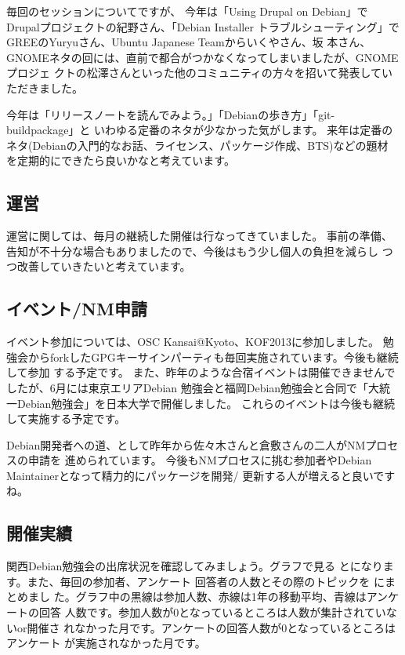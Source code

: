 \documentclass[mingoth,a4paper]{jsarticle}
\begin{document}
毎回のセッションについてですが、
今年は「Using Drupal on Debian」でDrupalプロジェクトの紀野さん、「Debian Installer
トラブルシューティング」でGREEのYuryuさん、Ubuntu Japanese Teamからいくやさん、坂
本さん、GNOMEネタの回には、直前で都合がつかなくなってしまいましたが、GNOMEプロジェ
クトの松澤さんといった他のコミュニティの方々を招いて発表していただきました。

今年は「リリースノートを読んでみよう。」「Debianの歩き方」「git-buildpackage」と
いわゆる定番のネタが少なかった気がします。
来年は定番のネタ(Debianの入門的なお話、ライセンス、パッケージ作成、BTS)などの題材
を定期的にできたら良いかなと考えています。

\subsection{運営}

運営に関しては、毎月の継続した開催は行なってきていました。
事前の準備、告知が不十分な場合もありましたので、今後はもう少し個人の負担を減らし
つつ改善していきたいと考えています。

\subsection{イベント/NM申請}

イベント参加については、OSC Kansai@Kyoto、KOF2013に参加しました。
勉強会からforkしたGPGキーサインパーティも毎回実施されています。今後も継続して参加
する予定です。
%
また、昨年のような合宿イベントは開催できませんでしたが、6月には東京エリアDebian
勉強会と福岡Debian勉強会と合同で「大統一Debian勉強会」を日本大学で開催しました。
これらのイベントは今後も継続して実施する予定です。

Debian開発者への道、として昨年から佐々木さんと倉敷さんの二人がNMプロセスの申請を
進められています。
今後もNMプロセスに挑む参加者やDebian Maintainerとなって精力的にパッケージを開発/
更新する人が増えると良いですね。

\subsection{開催実績}

関西Debian勉強会の出席状況を確認してみましょう。グラフで見る
とになります。また、毎回の参加者、アンケート
回答者の人数とその際のトピックを  にまとめまし
た。グラフ中の黒線は参加人数、赤線は1年の移動平均、青線はアンケートの回答
人数です。参加人数が$0$となっているところは人数が集計されていないor開催さ
れなかった月です。アンケートの回答人数が$0$となっているところはアンケート
が実施されなかった月です。
\end{document}
